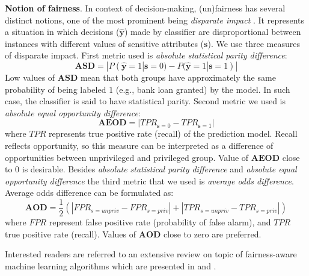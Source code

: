 \documentclass[preprint,12pt]{elsarticle}
\begin{document}
\textbf{Notion of fairness}. In context of decision-making, (un)fairness has several distinct notions, one of the most prominent being {\em disparate impact} \cite{barocas2016big}. It represents a situation in which decisions ($\hat{\mathbf{y}}$) made by classifier are disproportional between instances with different values of sensitive attributes ($\mathbf{s}$). We use three measures of disparate impact. First metric used is \textit{absolute statistical parity difference}:
\begin{equation}
\mathbf{ASD} = |P(\hat{\mathbf{y}}=1|\mathbf{s}=0) - P(\hat{\mathbf{y}}=1|\mathbf{s}=1)|
\label{metric:asd}
\end{equation}
Low values of $\mathbf{ASD}$ mean that both groups have approximately the same probability of being labeled $1$ (e.g., bank loan granted) by the model. In such case, the classifier is said to have statistical parity.
Second metric we used is \textit{absolute equal opportunity difference}:
\begin{equation}
\mathbf{AEOD} = |TPR_{\mathbf{s}=0} - TPR_{\mathbf{s}=1}|
\label{metric:aeod}
\end{equation}
where $TPR$ represents true positive rate (recall) of the prediction model. Recall reflects opportunity, so this measure can be interpreted as a difference of opportunities between unprivileged and privileged group. Value of $\mathbf{AEOD}$ close to 0 is desirable. 
Besides \textit{absolute statistical parity difference} and \textit{absolute equal opportunity difference} the third metric that we used is \textit{average odds difference}. Average odds difference can be formulated as:
\begin{equation}
\mathbf{AOD} = \frac{1}{2}(|FPR_{s=unpriv} - FPR_{s=priv}| + |TPR_{s=unpriv} - TPR_{s=priv}|)
\label{metric:aod}
\end{equation}
where $FPR$ represent false positive rate (probability of false alarm), and $TPR$ true positive rate (recall). Values of $\mathbf{AOD}$ close to zero are preferred.

Interested readers are referred to an extensive review on topic of fairness-aware machine learning algorithms which are presented in \cite{friedler2019comparative} and \cite{corbett2018measure}.
\end{document}
